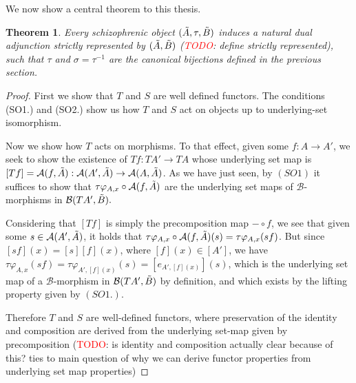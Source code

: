 \documentclass[12pt,a4paper]{article}
\newtheorem{theorem}{Theorem}[section] %
\def\HomA{\ensuremath\mathcal{A}}
\def\HomB{\ensuremath\mathcal{B}}
\def\t{\ensuremath\tilde}
\begin{document}
We now show a central theorem to this thesis.

\begin{theorem}
	Every schizophrenic object $(\t A, \tau , \t B)$ induces a natural dual adjunction strictly represented by $(\t A, \t B)$ (\textcolor{red}{TODO}: define strictly represented), such that $\tau$ and $\sigma = \tau^{-1}$ are the canonical bijections defined in the previous section.
\end{theorem}
\begin{proof}
	First we show that $T$ and $S$ are well defined functors. The conditions (SO1.) and (SO2.) show us how $T$ and $S$ act on objects up to underlying-set isomorphism. 
	
	Now we show how $T$ acts on morphisms. To that effect, given some $f: A \to A'$, we seek to show the existence of $Tf: TA' \to TA$ whose underlying set map is $[Tf] = \HomA(f, \t A): \HomA(A', \t A) \to \HomA(A, \t A)$. As we have just seen, by $(SO1)$ it suffices to show that $\tau \varphi_{A,x}\circ \HomA(f, \t A)$ are the underlying set maps of  $\mathcal{B}$-morphisms in $\HomB(TA', \t B).$
	
	Considering that $[Tf]$ is simply the precomposition map $- \circ f$, we see that given some $s \in \HomA(A', \t A)$, it holds that $\tau \varphi_{A,x}\circ \HomA(f, \t A)(s) =\tau \varphi_{A,x}(sf)$. But since $[sf](x) = [s][f](x)$, where $[f](x) \in [A']$, we have $\tau \varphi_{A,x}(sf) = \tau \varphi_{A',[f](x)}(s) = [e_{A',[f](x)}](s)$, which is the underlying set map of a $\mathcal{B}$-morphism in $\HomB(TA', \t B)$ by definition, and which exists by the lifting property given by $(SO1.)$. 
	
	Therefore $T$ and $S$ are well-defined functors, where preservation of the identity and composition are derived from the underlying set-map given by precomposition (\textcolor{red}{TODO}:  is identity and composition actually clear because of this? ties to main question of why we can derive functor properties from underlying set map properties)
	

\end{proof}
\end{document}
